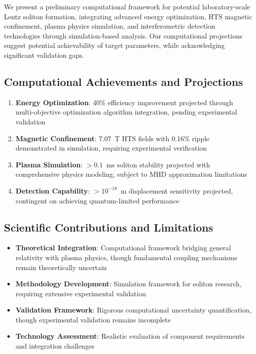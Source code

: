 \documentclass[12pt,a4paper]{article}
\begin{document}
We present a preliminary computational framework for potential laboratory-scale Lentz soliton formation, integrating advanced energy optimization, HTS magnetic confinement, plasma physics simulation, and interferometric detection technologies through simulation-based analysis. Our computational projections suggest potential achievability of target parameters, while acknowledging significant validation gaps.

\subsection{Computational Achievements and Projections}
\begin{enumerate}
\item \textbf{Energy Optimization}: 40\% efficiency improvement projected through multi-objective optimization algorithm integration, pending experimental validation
\item \textbf{Magnetic Confinement}: 7.07~T HTS fields with 0.16\% ripple demonstrated in simulation, requiring experimental verification  
\item \textbf{Plasma Simulation}: $>0.1$~ms soliton stability projected with comprehensive physics modeling, subject to MHD approximation limitations
\item \textbf{Detection Capability}: $>10^{-18}$~m displacement sensitivity projected, contingent on achieving quantum-limited performance
\end{enumerate}

\subsection{Scientific Contributions and Limitations}
\begin{itemize}
\item \textbf{Theoretical Integration}: Computational framework bridging general relativity with plasma physics, though fundamental coupling mechanisms remain theoretically uncertain
\item \textbf{Methodology Development}: Simulation framework for soliton research, requiring extensive experimental validation
\item \textbf{Validation Framework}: Rigorous computational uncertainty quantification, though experimental validation remains incomplete
\item \textbf{Technology Assessment}: Realistic evaluation of component requirements and integration challenges
\end{itemize}
\end{document}
